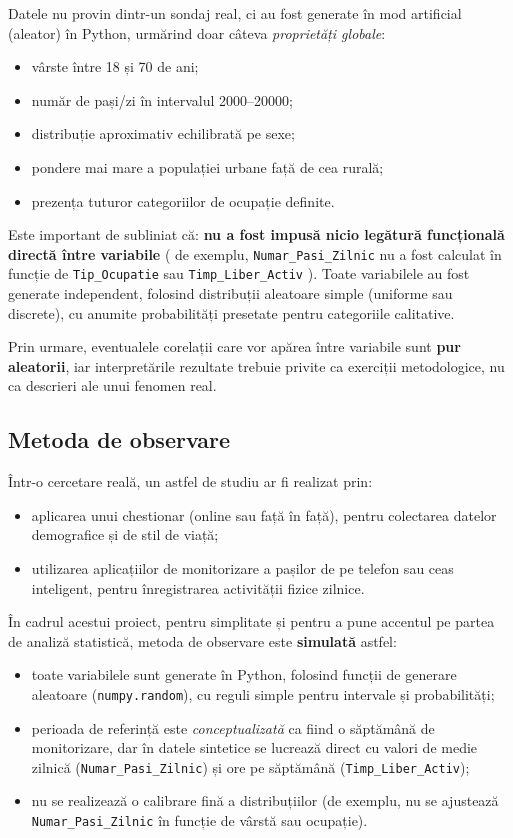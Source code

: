 \documentclass[12pt,a4paper]{report}
\begin{document}
Datele nu provin dintr-un sondaj real, ci au fost generate în mod artificial (aleator) în Python, urmărind doar câteva \textit{proprietăți globale}:
\begin{itemize}
  \item vârste între 18 și 70 de ani;
  \item număr de pași/zi în intervalul 2000–20000;
  \item distribuție aproximativ echilibrată pe sexe;
  \item pondere mai mare a populației urbane față de cea rurală;
  \item prezența tuturor categoriilor de ocupație definite.
\end{itemize}

Este important de subliniat că:
\textbf{nu a fost impusă nicio legătură funcțională directă între variabile}
( de exemplu, \texttt{Numar\_Pasi\_Zilnic} nu a fost calculat în funcție de \texttt{Tip\_Ocupatie} sau \texttt{Timp\_Liber\_Activ} ). Toate variabilele au fost generate independent, folosind distribuții aleatoare simple (uniforme sau discrete), cu anumite probabilități presetate pentru categoriile calitative.

Prin urmare, eventualele corelații care vor apărea între variabile sunt \textbf{pur aleatorii}, iar interpretările rezultate trebuie privite ca exerciții metodologice, nu ca descrieri ale unui fenomen real.

\subsection{Metoda de observare}

Într-o cercetare reală, un astfel de studiu ar fi realizat prin:
\begin{itemize}[leftmargin=1.2cm]
  \item aplicarea unui chestionar (online sau față în față), pentru colectarea datelor demografice și de stil de viață;
  \item utilizarea aplicațiilor de monitorizare a pașilor de pe telefon sau ceas inteligent, pentru înregistrarea activității fizice zilnice.
\end{itemize}

În cadrul acestui proiect, pentru simplitate și pentru a pune accentul pe partea de analiză statistică, metoda de observare este \textbf{simulată} astfel:
\begin{itemize}
  \item toate variabilele sunt generate în Python, folosind funcții de generare aleatoare (\texttt{numpy.random}), cu reguli simple pentru intervale și probabilități;
  \item perioada de referință este \textit{conceptualizată} ca fiind o săptămână de monitorizare, dar în datele sintetice se lucrează direct cu valori de medie zilnică (\texttt{Numar\_Pasi\_Zilnic}) și ore pe săptămână (\texttt{Timp\_Liber\_Activ});
  \item nu se realizează o calibrare fină a distribuțiilor (de exemplu, nu se ajustează \texttt{Numar\_Pasi\_Zilnic} în funcție de vârstă sau ocupație).
\end{itemize}
\end{document}
